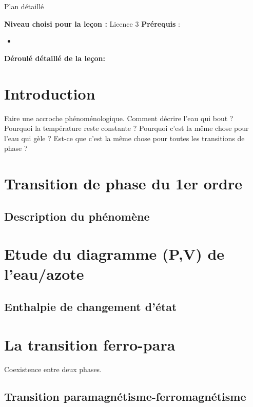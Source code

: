 \begin{reportBlock}{Plan détaillé}

  \textbf{Niveau choisi pour la leçon :} Licence 3
  \newline
  \textbf{Prérequis} : \begin{itemize}
      \item 
  \end{itemize}

  \textbf{Déroulé détaillé de la leçon: }  
  
  \section*{Introduction}
Faire une accroche phénoménologique. Comment décrire l'eau qui bout ? Pourquoi la température reste constante ? Pourquoi c'est la même chose pour l'eau qui gèle ? Est-ce que c'est la même chose pour toutes les transitions de phase ?

  \section{Transition de phase du 1er ordre}

  
  \subsection{Description du phénomène}

  
  \section{Etude du diagramme (P,V) de l'eau/azote}
  
  
  \subsection{Enthalpie de changement d'état} 


  \section{La transition ferro-para}
  Coexistence entre deux phases. 
\subsection{Transition paramagnétisme-ferromagnétisme}


\end{reportBlock}
